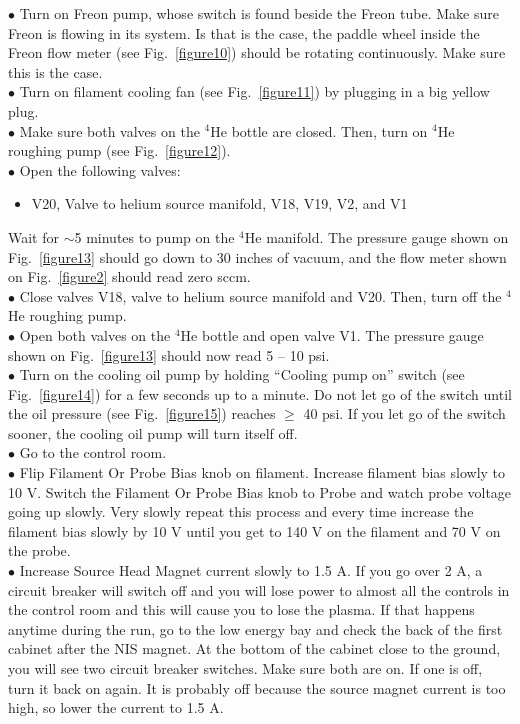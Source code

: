 \documentclass{article}
\begin{document}
$\bullet$ Turn on Freon pump, whose switch is found beside the Freon tube. Make sure Freon is flowing in its system. Is that is the case, the paddle wheel inside the Freon flow meter (see Fig.~\ref{figure10}) should be rotating continuously. Make sure this is the case.\\
$\bullet$ Turn on filament cooling fan (see Fig.~\ref{figure11}) by plugging in a big yellow plug.\\
$\bullet$ Make sure both valves on the $^{4}$He bottle are closed. Then, turn on $^{4}$He roughing pump (see Fig.~\ref{figure12}).\\
$\bullet$ Open the following valves:
\begin{itemize}
  \item V20, Valve to helium source manifold, V18, V19, V2, and V1
\end{itemize}
Wait for $\sim$5 minutes to pump on the $^{4}$He manifold. The pressure gauge shown on Fig.~\ref{figure13} should go down to 30 inches of vacuum, and the flow meter shown on Fig.~\ref{figure2} should read zero sccm.\\
$\bullet$ Close valves V18, valve to helium source manifold and V20. Then, turn off the $^{4}$He roughing pump.\\
$\bullet$ Open both valves on the $^{4}$He bottle and open valve V1. The pressure gauge shown on Fig.~\ref{figure13} should now read 5 -- 10 psi.\\
$\bullet$ Turn on the cooling oil pump by holding ``Cooling pump on'' switch (see Fig.~\ref{figure14}) for a few seconds up to a minute. Do not let go of the switch until the oil pressure (see Fig.~\ref{figure15}) reaches $\geq$ 40 psi. If you let go of the switch sooner, the cooling oil pump will turn itself off.\\
$\bullet$ Go to the control room.\\
$\bullet$ Flip Filament Or Probe Bias knob on filament. Increase filament bias slowly to 10 V. Switch the Filament Or Probe Bias knob to Probe and watch probe voltage going up slowly. Very slowly repeat this process and every time increase the filament bias slowly by 10 V until you get to 140 V on the filament and 70 V on the probe.\\
$\bullet$ Increase Source Head Magnet current slowly to 1.5 A. If you go over 2 A, a circuit breaker will switch off and you will lose power to almost all the controls in the control room and this will cause you to lose the plasma. If that happens anytime during the run, go to the low energy bay and check the back of the first cabinet after the NIS magnet. At the bottom of the cabinet close to the ground, you will see two circuit breaker switches. Make sure both are on. If one is off, turn it back on again. It is probably off because the source magnet current is too high, so lower the current to 1.5 A.\\
\end{document}
